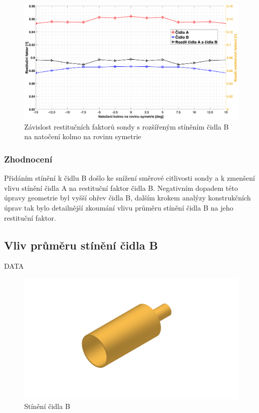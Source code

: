              \begin{figure}[ht!]
                \centering
                \includegraphics*[width=\textwidth, trim={5.9cm 1.0cm 2.7cm 2.0cm}]{400_SIMULACE_KONSTRUKCNICH_UPRAV/Grafy/03_kolma_rovina}
                \caption{Závislost restitučních faktorů sondy s rozšířeným stíněním čidla B na natočení kolmo na rovinu symetrie}
                \label{fig:sonda-s-rosirenym-stinenim-kolma-rovina}
            \end{figure}

        \subsubsection{Zhodnocení}
            Přidáním stínění k čidlu B došlo ke snížení směrové citlivosti sondy a k zmenšení vlivu stínění čidla A na restituční faktor čidla B. Negativním dopadem této úpravy geometrie byl vyšší ohřev čidla B, dalším krokem analýzy konstrukčních úprav tak bylo detailnější zkoumání vlivu průměru stínění čidla B na jeho restituční faktor.
        
    \subsection{Vliv průměru stínění čidla B}
        DATA
        
        \begin{figure}[ht!]
            \centering
            \includegraphics[width=\textwidth]{400_SIMULACE_KONSTRUKCNICH_UPRAV/Vykresy_rendery/Stineni_B.png}
            \caption{Stínění čidla B}
            \label{fig:stineni-B}
        \end{figure}
        
